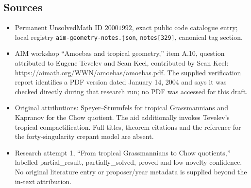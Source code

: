 \documentclass[11pt]{article}
\begin{document}
\subsection{Sources}
\begin{itemize}
\item Permanent UnsolvedMath ID \(20001992\), exact public code catalogue entry; local registry \texttt{aim-geometry-notes.json}, \texttt{notes[329]}, canonical tag section.
\item AIM workshop ``Amoebas and tropical geometry,'' item A.10, question attributed to Eugene Tevelev and Sean Keel, contributed by Sean Keel: \url{https://aimath.org/WWN/amoebas/amoebas.pdf}. The supplied verification report identifies a PDF version dated January 14, 2004 and says it was checked directly during that research run; no PDF was accessed for this draft.
\item Original attributions: Speyer--Sturmfels for tropical Grassmannians and Kapranov for the Chow quotient. The aid additionally invokes Tevelev's tropical compactification. Full titles, theorem citations and the reference for the forty-singularity crepant model are absent.
\item Research attempt 1, ``From tropical Grassmannians to Chow quotients,'' labelled partial\_result, partially\_solved, proved and low novelty confidence. No original literature entry or proposer/year metadata is supplied beyond the in-text attribution.
\end{itemize}
\end{document}
